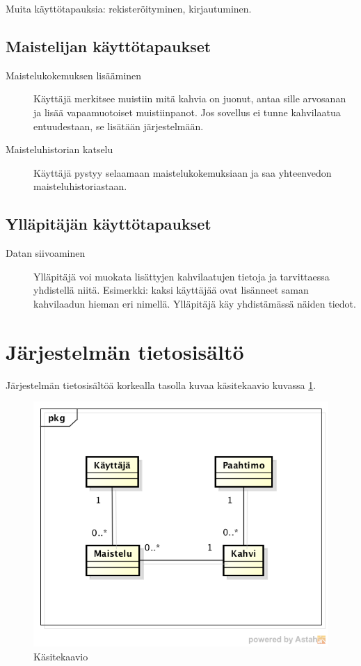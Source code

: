\documentclass[a4paper,titlepage]{article}
\begin{document}
Muita käyttötapauksia: rekisteröityminen, kirjautuminen.

\subsection{Maistelijan käyttötapaukset}

\begin{description}
\item[Maistelukokemuksen lisääminen] Käyttäjä merkitsee muistiin mitä
  kahvia on juonut, antaa sille arvosanan ja lisää vapaamuotoiset
  muistiinpanot. Jos sovellus ei tunne kahvilaatua entuudestaan, se
  lisätään järjestelmään.

\item[Maisteluhistorian katselu] Käyttäjä pystyy selaamaan
  maistelukokemuksiaan ja saa yhteenvedon maisteluhistoriastaan.
\end{description}

\subsection{Ylläpitäjän käyttötapaukset}

\begin{description}
\item[Datan siivoaminen] Ylläpitäjä voi muokata lisättyjen
  kahvilaatujen tietoja ja tarvittaessa yhdistellä niitä. Esimerkki:
  kaksi käyttäjää ovat lisänneet saman kahvilaadun hieman eri
  nimellä. Ylläpitäjä käy yhdistämässä näiden tiedot.
\end{description}


\section{Järjestelmän tietosisältö}

Järjestelmän tietosisältöä korkealla tasolla kuvaa käsitekaavio
kuvassa \ref{fig:käsitekaavio}.

\begin{figure}[ht]
  \includegraphics[width=12cm]{database}
  \caption{Käsitekaavio}
  \label{fig:käsitekaavio}
\end{figure}
\end{document}
